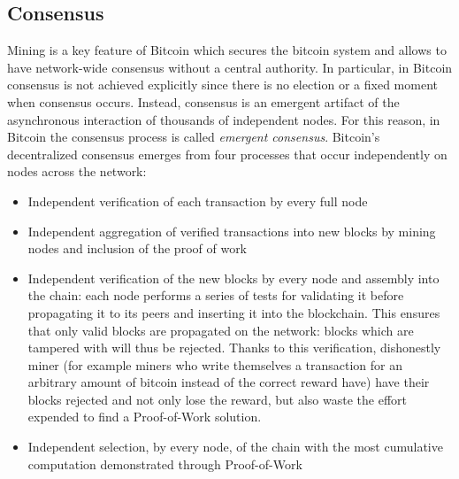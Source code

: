 \subsection{Consensus} Mining is a key feature of Bitcoin which secures the
bitcoin system and allows to have network-wide consensus without a central
authority. In particular, in Bitcoin consensus is not achieved explicitly since
there is no election or a fixed moment when consensus occurs. Instead, consensus
is an emergent artifact of the asynchronous interaction of thousands of
independent nodes. For this reason, in Bitcoin the consensus process is called
\emph{emergent consensus}. Bitcoin’s decentralized consensus emerges from
four processes that occur independently on nodes across the network:
\begin{itemize}
  \item Independent verification of each transaction by every full node
  \item Independent aggregation of verified transactions into new blocks by mining
  nodes and inclusion of the proof of work
  \item Independent verification of the new blocks by every node and assembly
  into the chain: each node performs a series of tests for validating it before
  propagating it to its peers and inserting it into the blockchain.
  This ensures that only valid blocks are propagated on the network: blocks which
  are tampered with will thus be rejected.
  Thanks to this verification, dishonestly miner (for example miners who write
  themselves a transaction for an arbitrary amount of bitcoin instead of the correct reward have)
  have their blocks rejected and not only lose the reward, but also waste the
  effort expended to find a Proof-of-Work solution.
  \item Independent selection, by every node, of the chain with the most
  cumulative computation demonstrated through Proof-of-Work
\end{itemize}


